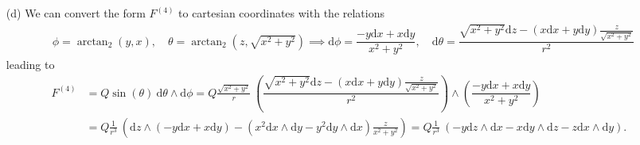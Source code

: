 \documentclass[10pt, a4paper]{article}
\begin{document}
{\begin{enumerate}
  \begin{align*}
  \star\ \text{d}\theta \wedge \text{d}\phi &= \sqrt{|r^4 \sin^2 \theta|}\frac{1}{2!}\frac{1}{2!}\varepsilon^{\theta \phi}{}_{r t} \text{d} r \wedge \text{d} t + \frac{1}{2!}\frac{1}{2!}\varepsilon^{\theta \phi}{}_{t r} \text{d} t \wedge \text{d} r - \frac{1}{2!}\frac{1}{2!}\varepsilon^{\phi \theta}{}_{r t} \text{d} r \wedge \text{d} t - \frac{1}{2!}\frac{1}{2!}\varepsilon^{\phi \theta}{}_{t r} \text{d} t \wedge \text{d} r \\
  &= r^2 |\sin \theta|\eta^{\theta \theta}\eta^{\phi \phi}\left(\frac{1}{2!}\frac{1}{2!}\varepsilon_{\theta \phi r t} \text{d} r \wedge \text{d} t + \frac{1}{2!}\frac{1}{2!}\varepsilon_{\theta \phi t r} \text{d} t \wedge \text{d} r - \frac{1}{2!}\frac{1}{2!}\varepsilon_{\phi \theta r t} \text{d} r \wedge \text{d} t - \frac{1}{2!}\frac{1}{2!}\varepsilon_{\phi \theta t r} \text{d} t \wedge \text{d} r\right)\\
  &= r^2 |\sin \theta|\frac{1}{r^4 \sin^2 \theta}\frac{1}{2!}\frac{1}{2!}\left((-1)\ \text{d} r \wedge \text{d} t + (+1)\ \text{d} t \wedge \text{d} r - (+1)\ \text{d} r \wedge \text{d} t - (-1)\ \text{d} t \wedge \text{d} r\right) = \text{d} t \wedge \text{d} r
  \end{align*}
  and it follows that $\text{d} \star F^{(4)} = \text{d} (Q/r^2\ \left(\text{d} t \wedge \text{d} r\right)) =  -Q/r^3\ \left( \text{d} r \wedge \text{d} t \wedge \text{d} r\right) = 0$ where the absolute value was ignored because $\theta \in (0, 2\pi)$ making $\sin(\theta) > 0$. 
  \item[(d)] We can convert the form $F^{(4)}$ to cartesian coordinates with the relations 
  \begin{align*}
      &\phi = \arctan_2\left(y, x\right),\quad
      \theta = \arctan_2\left(z, \sqrt{x^2 + y^2}\right)
      \implies
    \text{d}\phi = \dfrac{-y \text{d}x + x\text{d}y}{x^2 + y^2}, \quad 
    \text{d}\theta = \dfrac{\sqrt{x^2 + y^2}\text{d}z - (x\text{d}x + y\text{d}y)\frac{z}{\sqrt{x^2 + y^2}}}{r^2}
  \end{align*} 
  leading to 
  \begin{align*}
    F^{(4)} &= Q \sin(\theta)\ \text{d}\theta \wedge \text{d}\phi = Q \frac{\sqrt{x^2+y^2}}{r}\ \left(\dfrac{\sqrt{x^2 + y^2}\text{d}z - (x\text{d}x + y\text{d}y)\frac{z}{\sqrt{x^2 + y^2}}}{r^2}\right) \wedge \left(\dfrac{-y \text{d}x + x\text{d}y}{x^2 + y^2}\right)\\
    &= Q \frac{1}{r^3}\ \left(\text{d}z \wedge (-y \text{d}x + x\text{d}y) - (x^2\text{d}x \wedge \text{d} y - y^2\text{d}y \wedge \text{d}x)\frac{z}{x^2 + y^2}\right) = Q \frac{1}{r^3}\ \left(-y\text{d}z \wedge \text{d}x - x\text{d}y \wedge \text{d}z - z\text{d}x \wedge \text{d} y\right). 

\end{align*}
\end{enumerate}}
\end{document}
